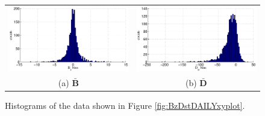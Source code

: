 \begin{figure}[ht]
\begin{tabular}{cc}
\includegraphics[scale=0.5]{SolarExample_Bzdailyhist.eps} & \includegraphics[scale=0.5]{SolarExample_Ddailyhist.eps} \\
(a) $\bar{\mathbf{B}}$ & (b) $\bar{\mathbf{D}}$
\end{tabular}
\caption{Histograms of the data shown in Figure \ref{fig:BzDstDAILYxyplot}.}
\label{fig:BzDstDAILYxyhist}
\end{figure}

